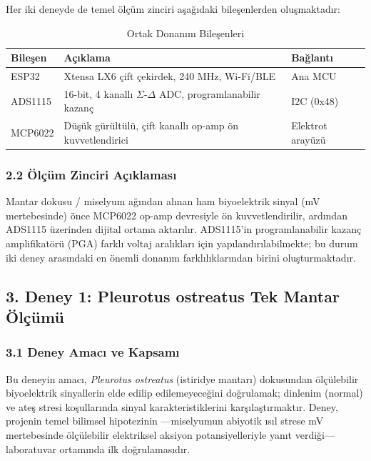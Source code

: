 \documentclass[11pt,a4paper]{article}
\begin{document}
Her iki deneyde de temel ölçüm zinciri aşağıdaki bileşenlerden oluşmaktadır:

\begin{table}[h]
\centering
\caption{Ortak Donanım Bileşenleri}
\begin{tabular}{p{2.2cm}p{7.5cm}p{3cm}}
\toprule
\textbf{Bileşen} & \textbf{Açıklama} & \textbf{Bağlantı}\\
\midrule
ESP32 & Xtensa LX6 çift çekirdek, 240 MHz, Wi-Fi/BLE & Ana MCU\\
ADS1115 & 16-bit, 4 kanallı $\Sigma$-$\Delta$ ADC, programlanabilir kazanç & I2C (0x48)\\
MCP6022 & Düşük gürültülü, çift kanallı op-amp ön kuvvetlendirici & Elektrot arayüzü\\
\bottomrule
\end{tabular}
\end{table}

\subsubsection*{2.2 Ölçüm Zinciri Açıklaması}

Mantar dokusu / miselyum ağından alınan ham biyoelektrik sinyal (mV mertebesinde) önce MCP6022 op-amp devresiyle ön kuvvetlendirilir, ardından ADS1115 üzerinden dijital ortama aktarılır. ADS1115'in programlanabilir kazanç amplifikatörü (PGA) farklı voltaj aralıkları için yapılandırılabilmekte; bu durum iki deney arasındaki en önemli donanım farklılıklarından birini oluşturmaktadır.

\subsection*{3. Deney 1: Pleurotus ostreatus Tek Mantar Ölçümü}

\subsubsection*{3.1 Deney Amacı ve Kapsamı}

Bu deneyin amacı, \textit{Pleurotus ostreatus} (istiridye mantarı) dokusundan ölçülebilir biyoelektrik sinyallerin elde edilip edilemeyeceğini doğrulamak; dinlenim (normal) ve ateş stresi koşullarında sinyal karakteristiklerini karşılaştırmaktır. Deney, projenin temel bilimsel hipotezinin ---miselyumun abiyotik ısıl strese mV mertebesinde ölçülebilir elektriksel aksiyon potansiyelleriyle yanıt verdiği--- laboratuvar ortamında ilk doğrulamasıdır.
\end{document}
